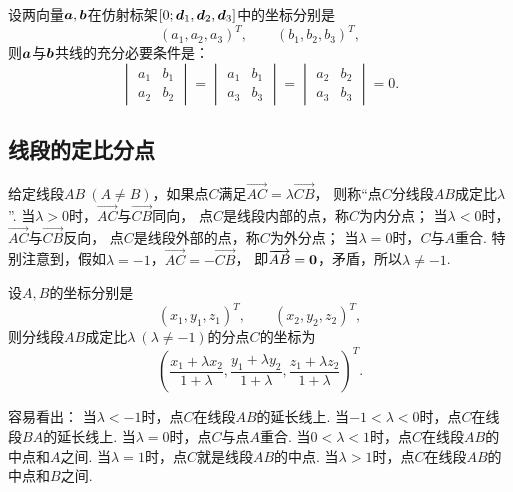 \begin{theorem}\label{theorem:解析几何.两向量共线的充分必要条件2}
设两向量\(\boldsymbol{a},\boldsymbol{b}\)在仿射标架\([0;\boldsymbol{d}_1,\boldsymbol{d}_2,\boldsymbol{d}_3]\)中的坐标分别是\begin{equation*}
	(a_1,a_2,a_3)^T, \qquad
	(b_1,b_2,b_3)^T,
\end{equation*}
则\(\boldsymbol{a}\)与\(\boldsymbol{b}\)共线的充分必要条件是：\begin{equation*}
\begin{vmatrix}
	a_1 & b_1 \\
	a_2 & b_2
\end{vmatrix}
= \begin{vmatrix}
	a_1 & b_1 \\
	a_3 & b_3
\end{vmatrix}
= \begin{vmatrix}
	a_2 & b_2 \\
	a_3 & b_3
\end{vmatrix} = 0.
\end{equation*}
\end{theorem}

\subsection{线段的定比分点}
给定线段\(AB\ (A \neq B)\)，如果点\(C\)满足\(\vec{AC} = \lambda \vec{CB}\)，
则称“点\(C\)分线段\(AB\)成定比\(\lambda\)”.
当\(\lambda>0\)时，\(\vec{AC}\)与\(\vec{CB}\)同向，
点\(C\)是线段内部的点，称\(C\)为内分点；
当\(\lambda<0\)时，\(\vec{AC}\)与\(\vec{CB}\)反向，
点\(C\)是线段外部的点，称\(C\)为外分点；
当\(\lambda=0\)时，\(C\)与\(A\)重合.
特别注意到，假如\(\lambda=-1\)，\(\vec{AC}=-\vec{CB}\)，
即\(\overrightarrow{AB}=\boldsymbol{0}\)，矛盾，所以\(\lambda\neq-1\).

\begin{theorem}\label{theorem:解析几何.空间两点的定比分点公式}
设\(A,B\)的坐标分别是\begin{equation*}
	(x_1,y_1,z_1)^T, \qquad
	(x_2,y_2,z_2)^T,
\end{equation*}
则分线段\(AB\)成定比\(\lambda\ (\lambda\neq-1)\)的分点\(C\)的坐标为
\begin{equation}
	\left(
		\frac{x_1 + \lambda x_2}{1+\lambda},
		\frac{y_1 + \lambda y_2}{1+\lambda},
		\frac{z_1 + \lambda z_2}{1+\lambda}
	\right)^T.
\end{equation}
\end{theorem}
\begin{remark}
容易看出：
当\(\lambda<-1\)时，点\(C\)在线段\(AB\)的延长线上.
当\(-1<\lambda<0\)时，点\(C\)在线段\(BA\)的延长线上.
当\(\lambda=0\)时，点\(C\)与点\(A\)重合.
当\(0<\lambda<1\)时，点\(C\)在线段\(AB\)的中点和\(A\)之间.
当\(\lambda=1\)时，点\(C\)就是线段\(AB\)的中点.
当\(\lambda>1\)时，点\(C\)在线段\(AB\)的中点和\(B\)之间.
\end{remark}

